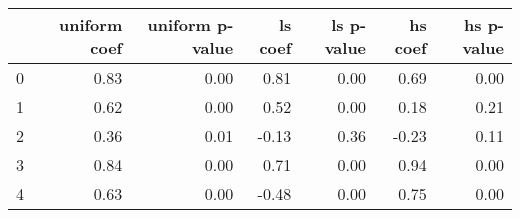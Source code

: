 \begin{tabular}{lrrrrrr}
\toprule
 & uniform coef & uniform p-value & ls coef & ls p-value & hs coef & hs p-value \\
\midrule
0 & 0.83 & 0.00 & 0.81 & 0.00 & 0.69 & 0.00 \\
1 & 0.62 & 0.00 & 0.52 & 0.00 & 0.18 & 0.21 \\
2 & 0.36 & 0.01 & -0.13 & 0.36 & -0.23 & 0.11 \\
3 & 0.84 & 0.00 & 0.71 & 0.00 & 0.94 & 0.00 \\
4 & 0.63 & 0.00 & -0.48 & 0.00 & 0.75 & 0.00 \\
\bottomrule
\end{tabular}
